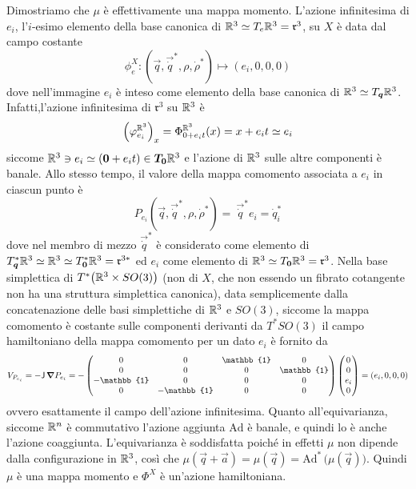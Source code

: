 Dimostriamo che $\mu$ è effettivamente una mappa momento. L'azione infinitesima di $e_i$, l'$i$-esimo elemento della base canonica di $\mathbb{R}^3 \simeq T_e \mathbb{R}^3 = \mathfrak{r}^3$, su $X$ è data dal campo costante
\begin{equation*}
\phi_{e}^X: (\vec{q},\vec{\dot{q}}^*, \rho, \dot{\rho}^*)\longmapsto (e_i, 0, 0, 0)
\end{equation*}
dove nell'immagine $e_i$ è inteso come elemento della base canonica di $\mathbb{R}^3 \simeq T_{\boldsymbol{q}}\mathbb{R}^3$. Infatti,l'azione infinitesima di $\mathfrak{r}^3$ su $\mathbb{R}^3$ è \begin{equation*}
  \Big(\varphi^{\mathbb{R}^3}_{e_i}\Big)_x = \Phi^{\mathbb{R}^3}_{0 + e_i t}(x) = x + e_i t \simeq e_i
\end{equation*}
siccome $\mathbb{R}^3 \ni e_i \simeq (\boldsymbol{0}+e_i t) \in \boldsymbol{T_0} \mathbb{R}^3 $ e l'azione di $\mathbb{R}^3$ sulle altre componenti è banale. Allo stesso tempo, il valore della mappa comomento associata a $e_i$ in ciascun punto è 
\begin{equation*}
  P_{e_i}(\vec{q},\vec{\dot{q}}^*, \rho, \dot{\rho}^*) =\ \vec{\dot{q}}^*\! e_i = \dot{q}^*_i
\end{equation*} 
dove nel membro di mezzo $\vec{\dot{q}}^*$ è considerato come elemento di $T^*_{\boldsymbol{q}}\mathbb{R}^3 \simeq \mathbb{R}^3 \simeq T^*_{\boldsymbol{0}}\mathbb{R}^3 = \mathfrak{r}^{3*}$ ed $e_i$ come elemento di $\mathbb{R}^3 \simeq T_{\boldsymbol{0}}\mathbb{R}^3 = \mathfrak{r}^3$. Nella base simplettica di $T^*\big(\mathbb{R}^3 \times  SO(3)\big)$ (non di $X$, che non essendo un fibrato cotangente non ha una struttura simplettica canonica), data semplicemente dalla concatenazione delle basi simplettiche di $\mathbb{R}^3$ e $SO(3)$, siccome la mappa comomento è costante sulle componenti derivanti da $T^*SO(3)$ il campo hamiltoniano della mappa comomento per un dato $e_i$ è fornito da \begin{equation*}
V_{P_{e_i}} = - \mathsf{J}\, \grad{P_{e_i}} = - \begin{pmatrix}
  0 & 0 & \mathbb{1} & 0 \\
  0 & 0 & 0 & \mathbb{1} \\
  -\mathbb{1} & 0 & 0 & 0 \\ 
  0 & -\mathbb{1} & 0 & 0 
\end{pmatrix} \begin{pmatrix}
0 \\ 0 \\ e_i \\ 0
\end{pmatrix} = (e_i, 0, 0, 0)
\end{equation*} 
ovvero esattamente il campo dell'azione infinitesima. Quanto all'equivarianza, siccome $\mathbb{R}^{n}$ è commutativo l'azione aggiunta $\mathrm{Ad}$ è banale, e quindi lo è anche l'azione coaggiunta. L'equivarianza è soddisfatta poiché in effetti $\mu$ non dipende dalla configurazione in $\mathbb{R}^3$, così che $\mu(\vec{q}+\vec{a}) = \mu(\vec{q}) = \mathrm{Ad}^*\,\big(\mu(\vec{q})\big)$. Quindi $\mu$ è una mappa momento e $\Phi^X$ è un'azione hamiltoniana.

